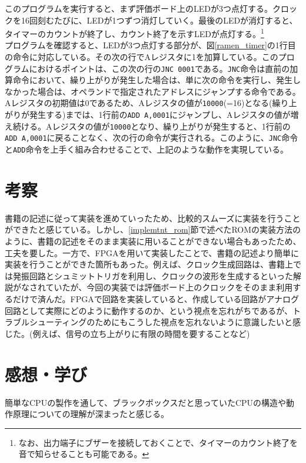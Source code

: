\documentclass[dvipdfmx,a4j, titlepage]{jsarticle}
\begin{document}
このプログラムを実行すると、まず評価ボード上のLEDが3つ点灯する。クロックを16回刻むたびに、LEDが1つずつ消灯していく。最後のLEDが消灯すると、タイマーのカウントが終了し、カウント終了を示すLEDが点灯する。\footnote{なお、出力端子にブザーを接続しておくことで、タイマーのカウント終了を音で知らせることも可能である。}\\
プログラムを確認すると、LEDが3つ点灯する部分が、図\ref{ramen_timer}の1行目の命令に対応している。その次の行でAレジスタに1を加算している。このプログラムにおけるポイントは、この次の行の\verb|JNC 0001|である。\verb|JNC|命令は直前の加算命令において、繰り上がりが発生した場合は、単に次の命令を実行し、発生しなかった場合は、オペランドで指定されたアドレスにジャンプする命令である。Aレジスタの初期値は0であるため、Aレジスタの値が\verb|10000|(=16)となる(繰り上がりが発生する)までは、1行前の\verb|ADD A,0001|にジャンプし、Aレジスタの値が増え続ける。Aレジスタの値が\verb|10000|となり、繰り上がりが発生すると、1行前の\verb|ADD A,0001|に戻ることなく、次の行の命令が実行される。このように、\verb|JNC|命令と\verb|ADD|命令を上手く組み合わせることで、上記のような動作を実現している。\\

\section{考察}
書籍の記述に従って実装を進めていったため、比較的スムーズに実装を行うことができたと感じている。しかし、\ref{implemtnt_rom}節で述べたROMの実装方法のように、書籍の記述をそのまま実装に用いることができない場合もあったため、工夫を要した。一方で、FPGAを用いて実装したことで、書籍の記述より簡単に実装を行うことができた箇所もあった。例えば、クロック生成回路は、書籍上では発振回路とシュミットトリガを利用し、クロックの波形を生成するといった解説がなされていたが、今回の実装では評価ボード上のクロックをそのまま利用するだけで済んだ。FPGAで回路を実装していると、作成している回路がアナログ回路として実際にどのように動作するのか、という視点を忘れがちであるが、トラブルシューティングのためにもこうした視点を忘れないように意識したいと感じた。(例えば、信号の立ち上がりに有限の時間を要することなど)\\

\section{感想・学び}
簡単なCPUの製作を通して、ブラックボックスだと思っていたCPUの構造や動作原理についての理解が深まったと感じる。
\end{document}
